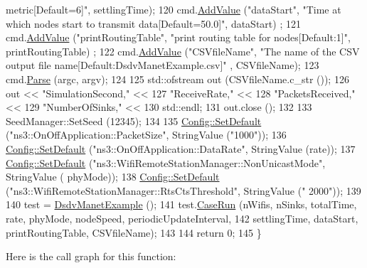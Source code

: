 \begin{DoxyCode}
{       metric[Default=6]"}, settlingTime);
120   cmd.\hyperlink{classns3_1_1CommandLine_addcfb546c7ad4c8bd0965654d55beb8e}{AddValue} (\textcolor{stringliteral}{"dataStart"}, \textcolor{stringliteral}{"Time at which nodes start to transmit data[Default=50.0]"}, dataStart)
      ;
121   cmd.\hyperlink{classns3_1_1CommandLine_addcfb546c7ad4c8bd0965654d55beb8e}{AddValue} (\textcolor{stringliteral}{"printRoutingTable"}, \textcolor{stringliteral}{"print routing table for nodes[Default:1]"}, printRoutingTable)
      ;
122   cmd.\hyperlink{classns3_1_1CommandLine_addcfb546c7ad4c8bd0965654d55beb8e}{AddValue} (\textcolor{stringliteral}{"CSVfileName"}, \textcolor{stringliteral}{"The name of the CSV output file name[Default:DsdvManetExample.csv]"}
      , CSVfileName);
123   cmd.\hyperlink{classns3_1_1CommandLine_a5c10b85b3207e5ecb48d907966923156}{Parse} (argc, argv);
124 
125   std::ofstream out (CSVfileName.c\_str ());
126   out << \textcolor{stringliteral}{"SimulationSecond,"} <<
127   \textcolor{stringliteral}{"ReceiveRate,"} <<
128   \textcolor{stringliteral}{"PacketsReceived,"} <<
129   \textcolor{stringliteral}{"NumberOfSinks,"} <<
130   std::endl;
131   out.close ();
132 
133   SeedManager::SetSeed (12345);
134 
135   \hyperlink{group__config_ga2e7882df849d8ba4aaad31c934c40c06}{Config::SetDefault} (\textcolor{stringliteral}{"ns3::OnOffApplication::PacketSize"}, StringValue (\textcolor{stringliteral}{"1000"}));
136   \hyperlink{group__config_ga2e7882df849d8ba4aaad31c934c40c06}{Config::SetDefault} (\textcolor{stringliteral}{"ns3::OnOffApplication::DataRate"}, StringValue (rate));
137   \hyperlink{group__config_ga2e7882df849d8ba4aaad31c934c40c06}{Config::SetDefault} (\textcolor{stringliteral}{"ns3::WifiRemoteStationManager::NonUnicastMode"}, StringValue (
      phyMode));
138   \hyperlink{group__config_ga2e7882df849d8ba4aaad31c934c40c06}{Config::SetDefault} (\textcolor{stringliteral}{"ns3::WifiRemoteStationManager::RtsCtsThreshold"}, StringValue (\textcolor{stringliteral}{"
      2000"}));
139 
140   test = \hyperlink{classDsdvManetExample}{DsdvManetExample} ();
141   test.\hyperlink{classDsdvManetExample_aa61b3622afce14d04f2cf656fba31f4d}{CaseRun} (nWifis, nSinks, totalTime, rate, phyMode, nodeSpeed, periodicUpdateInterval,
142                 settlingTime, dataStart, printRoutingTable, CSVfileName);
143 
144   \textcolor{keywordflow}{return} 0;
145 \}
\end{DoxyCode}


Here is the call graph for this function\+:


